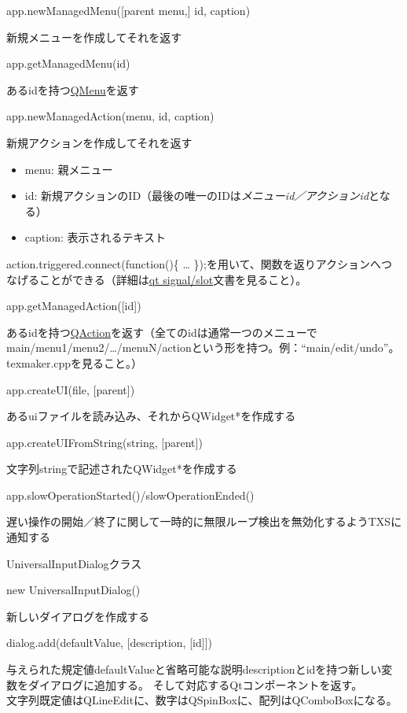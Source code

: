 \documentclass[]{book}
\begin{document}
app.newManagedMenu({[}parent menu,{]} id, caption)

新規メニューを作成してそれを返す

app.getManagedMenu(id)

あるidを持つ\href{http://developer.qt.nokia.com/doc/qt-4.8/QMenu.html}{QMenu}を返す

app.newManagedAction(menu, id, caption)

新規アクションを作成してそれを返す\\

\begin{itemize}
\item
  menu: 親メニュー
\item
  id:
  新規アクションのID（最後の唯一のIDは\emph{メニューid／アクションid}となる）
\item
  caption: 表示されるテキスト
\end{itemize}

action.triggered.connect(function()\{ \ldots{}
\});を用いて、関数を返りアクションへつなげることができる（詳細は\href{http://developer.qt.nokia.com/doc/qt-4.8/scripting.html\#signal-to-function-connections}{qt
signal/slot}文書を見ること）。

app.getManagedAction({[}id{]})

あるidを持つ\href{http://developer.qt.nokia.com/doc/qt-4.8/QAction.html}{QAction}を返す（全てのidは通常一つのメニューでmain/menu1/menu2/\ldots{}/menuN/actionという形を持つ。例：``main/edit/undo''。texmaker.cppを見ること。）

app.createUI(file, {[}parent{]})

あるuiファイルを読み込み、それからQWidget*を作成する

app.createUIFromString(string, {[}parent{]})

文字列stringで記述されたQWidget*を作成する

app.slowOperationStarted()/slowOperationEnded()

遅い操作の開始／終了に関して一時的に無限ループ検出を無効化するようTXSに通知する

UniversalInputDialogクラス

new UniversalInputDialog()

新しいダイアログを作成する

dialog.add(defaultValue, {[}description, {[}id{]}{]})

与えられた規定値defaultValueと省略可能な説明descriptionとidを持つ新しい変数をダイアログに追加する。
そして対応するQtコンポーネントを返す。\\
文字列既定値はQLineEditに、数字はQSpinBoxに、配列はQComboBoxになる。
\end{document}
